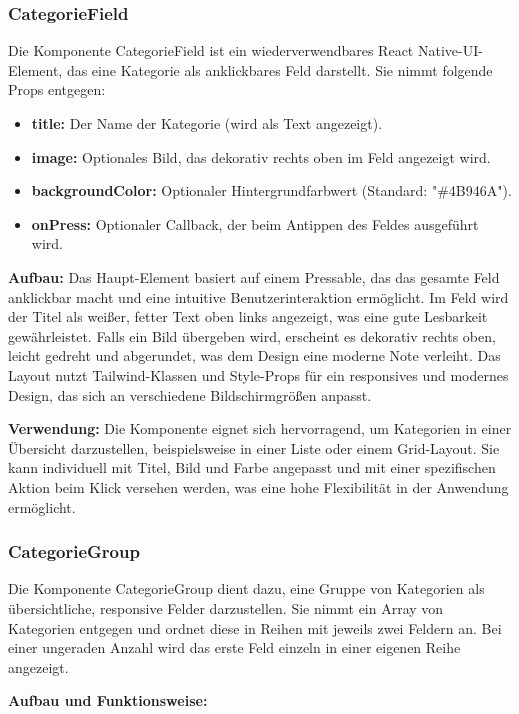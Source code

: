 \subsubsection{CategorieField}
Die Komponente CategorieField ist ein wiederverwendbares React Native-UI-Element, das eine Kategorie als anklickbares Feld darstellt. Sie nimmt folgende Props entgegen:
\begin{itemize}
    \item \textbf{title:} Der Name der Kategorie (wird als Text angezeigt).
    \item \textbf{image:} Optionales Bild, das dekorativ rechts oben im Feld angezeigt wird.
    \item \textbf{backgroundColor:} Optionaler Hintergrundfarbwert (Standard: "\#4B946A").
    \item \textbf{onPress:} Optionaler Callback, der beim Antippen des Feldes ausgeführt wird.
\end{itemize}

\noindent\textbf{Aufbau:}
Das Haupt-Element basiert auf einem Pressable, das das gesamte Feld anklickbar macht und eine intuitive Benutzerinteraktion ermöglicht. Im Feld wird der Titel als weißer, fetter Text oben links angezeigt, was eine gute Lesbarkeit gewährleistet. Falls ein Bild übergeben wird, erscheint es dekorativ rechts oben, leicht gedreht und abgerundet, was dem Design eine moderne Note verleiht. Das Layout nutzt Tailwind-Klassen und Style-Props für ein responsives und modernes Design, das sich an verschiedene Bildschirmgrößen anpasst.

\noindent\textbf{Verwendung:} Die Komponente eignet sich hervorragend, um Kategorien in einer Übersicht darzustellen, beispielsweise in einer Liste oder einem Grid-Layout. Sie kann individuell mit Titel, Bild und Farbe angepasst und mit einer spezifischen Aktion beim Klick versehen werden, was eine hohe Flexibilität in der Anwendung ermöglicht.

\subsubsection{CategorieGroup}
Die Komponente CategorieGroup dient dazu, eine Gruppe von Kategorien als übersichtliche, responsive Felder darzustellen. Sie nimmt ein Array von Kategorien entgegen und ordnet diese in Reihen mit jeweils zwei Feldern an. Bei einer ungeraden Anzahl wird das erste Feld einzeln in einer eigenen Reihe angezeigt.

\noindent\textbf{Aufbau und Funktionsweise:}

